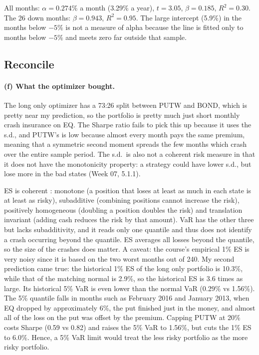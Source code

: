 \documentclass[11pt]{article}
\begin{document}
All months: $\alpha=0.274\%$ a month (3.29\% a year), $t=3.05$, $\beta=0.185$, $R^2=0.30$. The 26 down months: $\beta=0.943$, $R^2=0.95$. The large intercept (5.9\%) in the months below $-5\%$ is not a measure of alpha because the line is fitted only to months below $-5\%$ and meets zero far outside that sample.

\subsection*{Reconcile}

\paragraph{(f) What the optimizer bought.} The long only optimizer has a 73:26 split between PUTW and BOND, which is pretty near my prediction, so the portfolio is pretty much just short monthly crash insurance on EQ. The Sharpe ratio fails to pick this up because it uses the s.d., and PUTW's is low because almost every month pays the same premium, meaning that a symmetric second moment spreads the few months which crash over the entire sample period. The s.d.\ is also not a coherent risk measure in that it does not have the monotonicity property: a strategy could have lower s.d., but lose more in the bad states (Week 07, 5.1.1).

ES is coherent \citep{artzner1999coherent}: monotone (a position that loses at least as much in each state is at least as risky), subadditive (combining positions cannot increase the risk), positively homogeneous (doubling a position doubles the risk) and translation invariant (adding cash reduces the risk by that amount). VaR has the other three but lacks subadditivity, and it reads only one quantile and thus does not identify a crash occurring beyond the quantile. ES averages all losses beyond the quantile, so the size of the crashes does matter. A caveat: the course's empirical 1\% ES is very noisy since it is based on the two worst months out of 240. My second prediction came true: the historical 1\% ES of the long only portfolio is 10.3\%, while that of the matching normal is 2.9\%, so the historical ES is 3.6 times as large. Its historical 5\% VaR is even lower than the normal VaR (0.29\% vs 1.56\%). The 5\% quantile falls in months such as February 2016 and January 2013, when EQ dropped by approximately 6\%, the put finished just in the money, and almost all of the loss on the put was offset by the premium. Capping PUTW at 20\% costs Sharpe (0.59 vs 0.82) and raises the 5\% VaR to 1.56\%, but cuts the 1\% ES to 6.0\%. Hence, a 5\% VaR limit would treat the less risky portfolio as the more risky portfolio.
\end{document}
